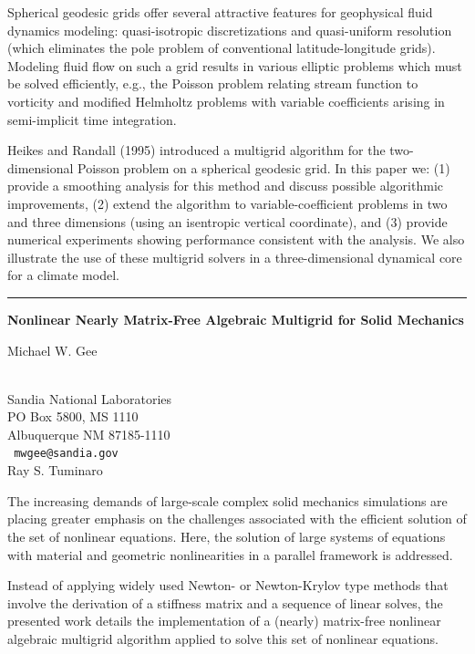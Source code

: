 \documentclass[twosided]{report}
\begin{document}
Spherical geodesic grids offer several attractive features for
geophysical fluid dynamics modeling: quasi-isotropic discretizations
and quasi-uniform resolution (which eliminates the pole problem of
conventional latitude-longitude grids). Modeling fluid flow on such a
grid results in various elliptic problems which must be solved
efficiently, e.g., the Poisson problem relating stream function to
vorticity and modified Helmholtz problems with variable coefficients
arising in semi-implicit time integration.

Heikes and Randall (1995) introduced a multigrid algorithm for the
two-dimensional Poisson problem on a spherical geodesic grid. In this
paper we: (1) provide a smoothing analysis for this method and discuss
possible algorithmic improvements, (2) extend the algorithm to
variable-coefficient problems in two and three dimensions (using an
isentropic vertical coordinate), and (3) provide numerical experiments
showing performance consistent with the analysis. We also illustrate
the use of these multigrid solvers in a three-dimensional dynamical
core for a climate model.

\begin{center}

\rule{6in}{1pt}
\end{center}

\begin{center}
{\large			\label{gee}
{\bf
Nonlinear Nearly Matrix-Free Algebraic Multigrid for Solid Mechanics
}

Michael W. Gee} \\
Sandia National Laboratories
\\
PO Box 5800, MS 1110
\\
Albuquerque  NM  87185-1110
\\ {\tt
mwgee@sandia.gov
}
\\
Ray S. Tuminaro
\end{center}

The increasing demands of large-scale complex solid mechanics
simulations are placing greater emphasis on the challenges associated
with the efficient solution of the set of nonlinear equations. Here,
the solution of large systems of equations with material and geometric
nonlinearities in a parallel framework is addressed.


Instead of applying widely used Newton- or Newton-Krylov type methods
that involve the derivation of a stiffness matrix and a sequence of
linear solves, the presented work details the implementation of a
(nearly) matrix-free nonlinear algebraic multigrid algorithm applied to
solve this set of nonlinear equations.
\end{document}
